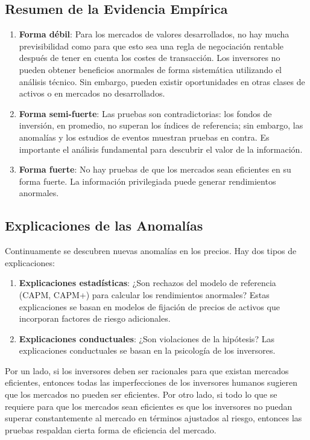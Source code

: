 \subsection{Resumen de la Evidencia Empírica}

\begin{enumerate}
\item \textbf{Forma débil}: Para los mercados de valores desarrollados, no hay mucha previsibilidad como para que esto sea una regla de negociación rentable después de tener en cuenta los costes de transacción. Los inversores no pueden obtener beneficios anormales de forma sistemática utilizando el análisis técnico. Sin embargo, pueden existir oportunidades en otras clases de activos o en mercados no desarrollados.

\item \textbf{Forma semi-fuerte}: Las pruebas son contradictorias: los fondos de inversión, en promedio, no superan los índices de referencia; sin embargo, las anomalías y los estudios de eventos muestran pruebas en contra. Es importante el análisis fundamental para descubrir el valor de la información.

\item \textbf{Forma fuerte}: No hay pruebas de que los mercados sean eficientes en su forma fuerte. La información privilegiada puede generar rendimientos anormales.
\end{enumerate}

\subsection{Explicaciones de las Anomalías}

Continuamente se descubren nuevas anomalías en los precios. Hay dos tipos de explicaciones:

\begin{enumerate}
\item \textbf{Explicaciones estadísticas}: ¿Son rechazos del modelo de referencia (CAPM, CAPM+) para calcular los rendimientos anormales? Estas explicaciones se basan en modelos de fijación de precios de activos que incorporan factores de riesgo adicionales.

\item \textbf{Explicaciones conductuales}: ¿Son violaciones de la hipótesis? Las explicaciones conductuales se basan en la psicología de los inversores.
\end{enumerate}

Por un lado, si los inversores deben ser racionales para que existan mercados eficientes, entonces todas las imperfecciones de los inversores humanos sugieren que los mercados no pueden ser eficientes. Por otro lado, si todo lo que se requiere para que los mercados sean eficientes es que los inversores no puedan superar constantemente al mercado en términos ajustados al riesgo, entonces las pruebas respaldan cierta forma de eficiencia del mercado.

